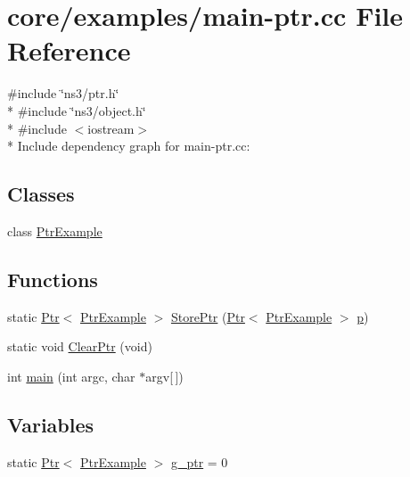 \hypertarget{main-ptr_8cc}{}\section{core/examples/main-\/ptr.cc File Reference}
\label{main-ptr_8cc}
{\ttfamily \#include \char`\"{}ns3/ptr.\+h\char`\"{}}\\*
{\ttfamily \#include \char`\"{}ns3/object.\+h\char`\"{}}\\*
{\ttfamily \#include $<$iostream$>$}\\*
Include dependency graph for main-\/ptr.cc\+:
\subsection*{Classes}
\begin{DoxyCompactItemize}
\item 
class \hyperlink{classPtrExample}{Ptr\+Example}
\end{DoxyCompactItemize}
\subsection*{Functions}
\begin{DoxyCompactItemize}
\item 
static \hyperlink{classns3_1_1Ptr}{Ptr}$<$ \hyperlink{classPtrExample}{Ptr\+Example} $>$ \hyperlink{main-ptr_8cc_a192be4f338c81bbf13abb66e0ba1db14}{Store\+Ptr} (\hyperlink{classns3_1_1Ptr}{Ptr}$<$ \hyperlink{classPtrExample}{Ptr\+Example} $>$ \hyperlink{lte__link__budget__x2__handover__measures_8m_ac9de518908a968428863f829398a4e62}{p})
\item 
static void \hyperlink{main-ptr_8cc_a6c8a7abd464ec1e718a0122299262f78}{Clear\+Ptr} (void)
\item 
int \hyperlink{main-ptr_8cc_a0ddf1224851353fc92bfbff6f499fa97}{main} (int argc, char $\ast$argv\mbox{[}$\,$\mbox{]})
\end{DoxyCompactItemize}
\subsection*{Variables}
\begin{DoxyCompactItemize}
\item 
static \hyperlink{classns3_1_1Ptr}{Ptr}$<$ \hyperlink{classPtrExample}{Ptr\+Example} $>$ \hyperlink{main-ptr_8cc_a7f246f352a3f9f2e28ba7d122c0788b8}{g\+\_\+ptr} = 0
\end{DoxyCompactItemize}


